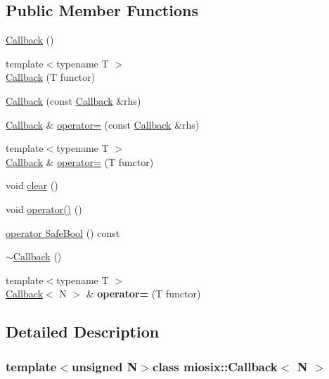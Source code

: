 \subsection*{Public Member Functions}
\begin{DoxyCompactItemize}
\item 
\hyperlink{classmiosix_1_1_callback_a96ef773ec6dc1b64e33b09ffc0d9fc4d}{Callback} ()
\item 
{\footnotesize template$<$typename T $>$ }\\\hyperlink{classmiosix_1_1_callback_a940e049ec2ea63460ade198ab16c4abb}{Callback} (T functor)
\item 
\hyperlink{classmiosix_1_1_callback_ab7ad8e46e7b5349815e83f062ee16e13}{Callback} (const \hyperlink{classmiosix_1_1_callback}{Callback} \&rhs)
\item 
\hyperlink{classmiosix_1_1_callback}{Callback} \& \hyperlink{classmiosix_1_1_callback_a05caba068253e7f5e8871f37e93c7982}{operator=} (const \hyperlink{classmiosix_1_1_callback}{Callback} \&rhs)
\item 
{\footnotesize template$<$typename T $>$ }\\\hyperlink{classmiosix_1_1_callback}{Callback} \& \hyperlink{classmiosix_1_1_callback_a78b946d98961747146a30beb17c8fc90}{operator=} (T functor)
\item 
void \hyperlink{classmiosix_1_1_callback_ae4f21e47bf046a21b701f6a24735487b}{clear} ()
\item 
void \hyperlink{classmiosix_1_1_callback_a344304b4878817b376c0f42180453f22}{operator()} ()
\item 
\hyperlink{classmiosix_1_1_callback_a912bac4bd4e042ff50a71ee9fb7ecc65}{operator Safe\-Bool} () const 
\item 
\hyperlink{classmiosix_1_1_callback_adb42a13047e3d3a79e253608642ae07e}{$\sim$\-Callback} ()
\item 
\hypertarget{classmiosix_1_1_callback_a22b301608703a85a1946b593dae6c316}{{\footnotesize template$<$typename T $>$ }\\\hyperlink{classmiosix_1_1_callback}{Callback}$<$ N $>$ \& {\bfseries operator=} (T functor)}\label{classmiosix_1_1_callback_a22b301608703a85a1946b593dae6c316}

\end{DoxyCompactItemize}


\subsection{Detailed Description}
\subsubsection*{template$<$unsigned N$>$class miosix\-::\-Callback$<$ N $>$}


